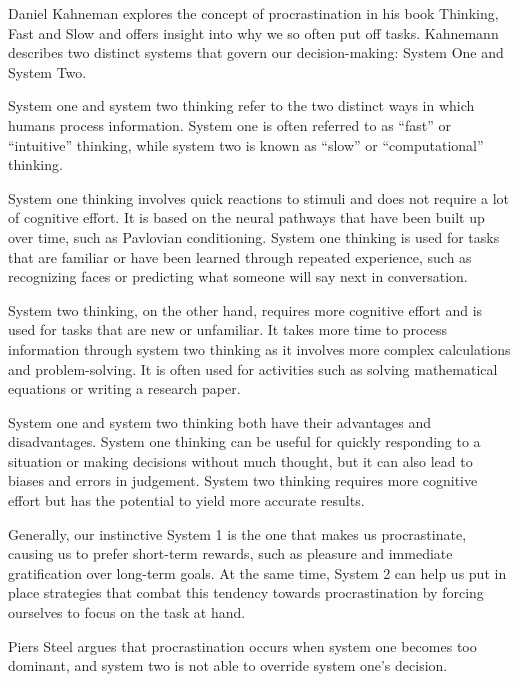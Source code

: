 Daniel Kahneman explores the concept of procrastination in his book Thinking, Fast and Slow and offers
insight into why we so often put off tasks.
Kahnemann describes two distinct systems that govern our decision-making: System One and System Two.

System one and system two thinking refer to the two distinct ways in which humans process information.
System one is often referred to as “fast” or “intuitive” thinking, while system two is known as
“slow” or “computational” thinking.

System one thinking involves quick reactions to stimuli and does not require a lot of cognitive effort.
It is based on the neural pathways that have been built up over time, such as Pavlovian conditioning.
System one thinking is used for tasks that are familiar or have been learned through repeated experience,
such as recognizing faces or predicting what someone will say next in conversation.


System two thinking, on the other hand, requires more cognitive effort
and is used for tasks that are new or unfamiliar.
It takes more time to process information through system two thinking
as it involves more complex calculations and
problem-solving.
It is often used for activities such as
solving mathematical equations or writing a research paper.


System one and system two thinking both have their advantages and disadvantages.
System one thinking can be useful for quickly responding to a situation or making decisions without much thought,
but it can also lead to biases and errors in judgement. System two thinking requires more cognitive effort but
has the potential to yield more accurate results.

Generally, our instinctive System 1 is the one that makes us procrastinate,
causing us to prefer short-term rewards, such as pleasure and immediate gratification over long-term goals.
At the same time, System 2 can help us put in place strategies that combat this tendency towards procrastination
by forcing ourselves to focus on the task at hand.\cite[p. 1 - 13]{Kahneman2011}

Piers Steel argues that procrastination occurs when system one becomes too dominant,
and system two is not able to override system one's decision.\cite[chapt. 3, p. 3]{Steel2007}